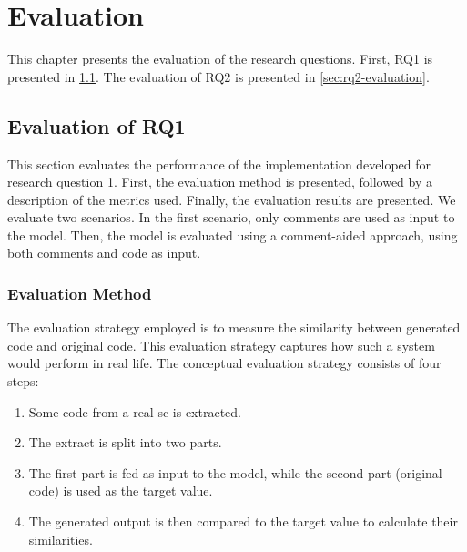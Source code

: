 
\chapter{Evaluation}
\label{chap:evaluation}
This chapter presents the evaluation of the research questions. First, RQ1 is presented in \cref{sec:rq1-evaluation}. The evaluation of RQ2 is presented in \cref{sec:rq2-evaluation}.

\section{Evaluation of RQ1}
\label{sec:rq1-evaluation}
This section evaluates the performance of the implementation developed for research question 1. First, the evaluation method is presented, followed by a description of the metrics used. Finally, the evaluation results are presented.  We evaluate two scenarios. In the first scenario, only comments are used as input to the model. Then, the model is evaluated using a comment-aided approach, using both comments and code as input.

\subsection{Evaluation Method}
\label{sec:rq1-evaluation-method}

The evaluation strategy employed is to measure the similarity between generated code and original code. This evaluation strategy captures how such a system would perform in real life. The conceptual evaluation strategy consists of four steps:
\begin{enumerate}
    \item Some code from a real \acrshort{sc} is extracted.
    \item The extract is split into two parts.
    \item The first part is fed as input to the model, while the second part (original code) is used as the target value.
    \item The generated output is then compared to the target value to calculate their similarities.
\end{enumerate}

